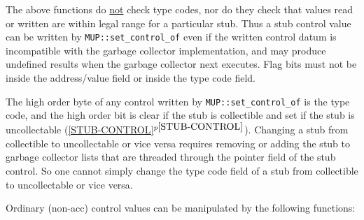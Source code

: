 \documentclass[12pt]{article}
\newcommand{\itemref}[1]{\ref{#1}$^{p\pageref{#1}}$}
\begin{document}
The above functions do \underline{not} check type codes, nor do they check
that values read or written are within legal range for a particular
stub.  Thus a stub control value
can be written by \verb|MUP::set_control_of| even if the written
control datum is incompatible with the garbage collector implementation,
and may produce undefined results when the garbage collector
next executes.  Flag bits must not be inside the address/value field
or inside the type code field.

The high order byte of any control written by \verb|MUP::set_control_of|
is the type code, and the high order bit is clear if the stub is collectible
and set if the stub is uncollectable (\itemref{STUB-CONTROL}).
Changing a stub from collectible to uncollectable or vice versa requires
removing or adding the stub to garbage collector lists that are threaded
through the pointer field of the stub control.  So one cannot simply
change the type code field of a stub from collectible to uncollectable
or vice versa.

Ordinary (non-acc) control values can be manipulated by the following functions:
\end{document}
